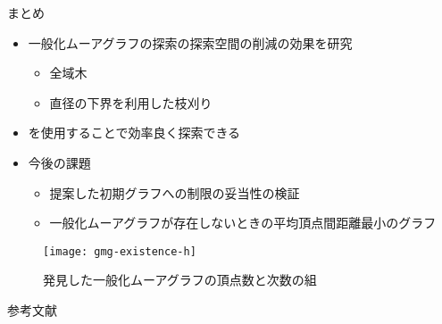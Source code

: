 \begin{frame}{まとめ}
  \begin{itemize}
  \item 一般化ムーアグラフの探索の探索空間の削減の効果を研究
    \begin{itemize}
    \item 全域木
    \item 直径の下界を利用した枝刈り
    \end{itemize}
  \item[] を使用することで効率良く探索できる
  \item 今後の課題
    \begin{itemize}
    \item 提案した初期グラフへの制限の妥当性の検証
    \item 一般化ムーアグラフが存在しないときの平均頂点間距離最小のグラフ
    \end{itemize}
  \end{itemize}
  \begin{figure}
    \centering
    \texttt{[image: gmg-existence-h]}
    \caption{発見した一般化ムーアグラフの頂点数と次数の組}
  \end{figure}
\end{frame}

\appendix
\begin{frame}[allowframebreaks]{参考文献}
  
\end{frame}

